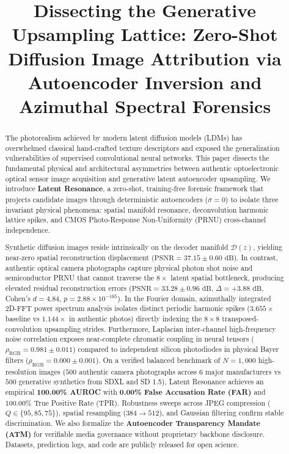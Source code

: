 \documentclass[conference]{IEEEtran}
\title{Dissecting the Generative Upsampling Lattice: Zero-Shot Diffusion Image Attribution via Autoencoder Inversion and Azimuthal Spectral Forensics}
\author{
\IEEEauthorblockN{Anonymous Authors}
\IEEEauthorblockA{IEEE WACV 2027 Workshops on Synthetic Media and Vision Safety\\
Paper under double-blind peer review\\
Email: anonymous@wacv2027.org}
}
\begin{document}
\maketitle

\begin{abstract}
The photorealism achieved by modern latent diffusion models (LDMs) has overwhelmed classical hand-crafted texture descriptors and exposed the generalization vulnerabilities of supervised convolutional neural networks. This paper dissects the fundamental physical and architectural asymmetries between authentic optoelectronic optical sensor image acquisition and generative latent autoencoder upsampling. We introduce \textbf{Latent Resonance}, a zero-shot, training-free forensic framework that projects candidate images through deterministic autoencoders ($\sigma = 0$) to isolate three invariant physical phenomena: spatial manifold resonance, deconvolution harmonic lattice spikes, and CMOS Photo-Response Non-Uniformity (PRNU) cross-channel independence.

Synthetic diffusion images reside intrinsically on the decoder manifold $\mathcal{D}(z)$, yielding near-zero spatial reconstruction displacement ($\text{PSNR} = 37.15 \pm 0.60\text{ dB}$). In contrast, authentic optical camera photographs capture physical photon shot noise and semiconductor PRNU that cannot traverse the $8\times$ latent spatial bottleneck, producing elevated residual reconstruction errors ($\text{PSNR} = 33.28 \pm 0.96\text{ dB}$, $\Delta = +3.88\text{ dB}$, Cohen's $d = 4.84$, $p = 2.88 \times 10^{-165}$). In the Fourier domain, azimuthally integrated 2D-FFT power spectrum analysis isolates distinct periodic harmonic spikes ($3.655\times$ baseline vs $1.144\times$ in authentic photos) directly indexing the $8\times 8$ transposed-convolution upsampling strides. Furthermore, Laplacian inter-channel high-frequency noise correlation exposes near-complete chromatic coupling in neural tensors ($\rho_{\text{RGB}} = 0.981 \pm 0.011$) compared to independent silicon photodiodes in physical Bayer filters ($\rho_{\text{RGB}} = 0.000 \pm 0.001$). On a verified balanced benchmark of $N=1,000$ high-resolution images ($500$ authentic camera photographs across 6 major manufacturers vs $500$ generative synthetics from SDXL and SD 1.5), Latent Resonance achieves an empirical \textbf{100.00\% AUROC} with \textbf{0.00\% False Accusation Rate (FAR)} and 100.00\% True Positive Rate (TPR). Robustness sweeps across JPEG compression ($Q \in \{95, 85, 75\}$), spatial resampling ($384 \to 512$), and Gaussian filtering confirm stable discrimination. We also formalize the \textbf{Autoencoder Transparency Mandate (ATM)} for verifiable media governance without proprietary backbone disclosure. Datasets, prediction logs, and code are publicly released for open science.
\end{abstract}
\end{document}
